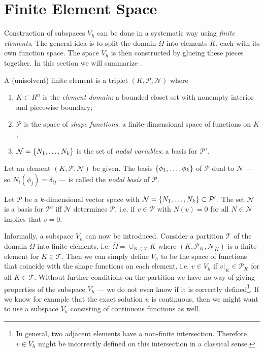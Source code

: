 \documentclass[thesis.tex]{subfiles}
\begin{document}
\section{Finite Element Space}
  Construction of subspaces $V_h$ can be done in a systematic way using \emph{finite elements}. 
  The general idea is to split the domain $\Omega$ into elements $K$, each with its own function space.
  The space $V_h$ is then constructed by glueing these pieces together. In this section we will summarize \cite[Ch~3]{brenner}.
  \begin{defn} 
    A (unisolvent) finite element is a triplet $(K, \mathcal{P}, \mathcal{N})$ where
    \begin{enumerate}[label=(\alph*)]
      \item $K \subset R^n$ is the \emph{element domain}: a bounded closet set with nonempty interior and piecewise boundary;
    \item $\mathcal{P}$ is the space of \emph{shape functions}: a finite-dimensional space of functions on $K$;
  \item $\mathcal{N} = \set{N_1, \dots, N_k}$ is the set of \emph{nodal variables}: a basis for $\mathcal{P}'$.
    \end{enumerate}
  \end{defn}
  \begin{defn}
    Let an element $(K, \mathcal{P}, \mathcal{N})$ be given. The basis $\set{\phi_1, \dots, \phi_k}$ of $\mathcal{P}$ dual to $\mathcal{N}$ --- so $N_i(\phi_j) = \delta_{ij}$ --- is called the \emph{nodal basis} of $\mathcal{P}$.
  \end{defn}
  \begin{lem}
    Let $\mathcal{P}$ be a $k$-dimensional vector space with $\mathcal{N} = \set{N_1, \dots, N_k} \subset \mathcal{P}'$.
    The set $\mathcal{N}$ is a basis for $\mathcal{P}'$ iff $\mathcal{N}$ determines $\mathcal{P}$, i.e. if $v \in \mathcal{P}$ with $N(v) = 0$ for all $N \in \mathcal{N}$ implies that $v = 0$.
  \end{lem}
  Informally, a subspace $V_h$ can now be introduced. Consider a partition $\mathcal{T}$ of the domain $\Omega$ into finite elements,
  i.e. $\overline{\Omega} = \cup_{K \in \mathcal{T}} K$ where $(K, \mathcal{P}_K, \mathcal{N}_K)$ is a finite element for $K \in \mathcal{T}$.
  Then we can simply define $V_h$ to be the space of functions that coincide with the shape functions on each element,
  i.e. $v \in V_h$ if $v|_{K} \in \mathcal{P}_K$ for all $K \in \mathcal{T}$. 
  Without further conditions on the partition we have no way of giving properties of the subspace $V_h$ --- we do not even know if it is correctly defined\footnote{In general, two adjacent elements have a non-finite intersection. 
  Therefore $v \in V_h$ might be incorrectly defined on this intersection in a classical sense.}.
  If we know for example that the exact solution $u$ is continuous, then we might want to use a subspace $V_h$ consisting of
  continuous functions as well. 
\end{document}
